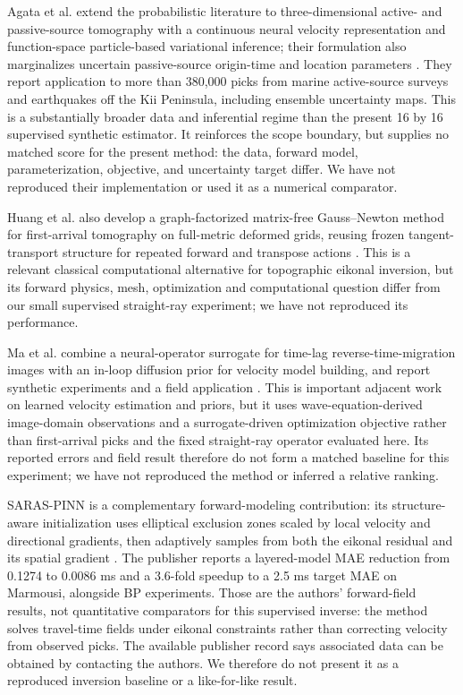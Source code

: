 \documentclass[11pt]{article}
\begin{document}
Agata et al. extend the probabilistic literature to three-dimensional active- and passive-source tomography with a continuous neural velocity representation and function-space particle-based variational inference; their formulation also marginalizes uncertain passive-source origin-time and location parameters \cite{AgataBayesian3D2026}. They report application to more than 380,000 picks from marine active-source surveys and earthquakes off the Kii Peninsula, including ensemble uncertainty maps. This is a substantially broader data and inferential regime than the present 16 by 16 supervised synthetic estimator. It reinforces the scope boundary, but supplies no matched score for the present method: the data, forward model, parameterization, objective, and uncertainty target differ. We have not reproduced their implementation or used it as a numerical comparator.

Huang et al. also develop a graph-factorized matrix-free Gauss--Newton method for first-arrival tomography on full-metric deformed grids, reusing frozen tangent-transport structure for repeated forward and transpose actions \cite{HuangDeformed2026}. This is a relevant classical computational alternative for topographic eikonal inversion, but its forward physics, mesh, optimization and computational question differ from our small supervised straight-ray experiment; we have not reproduced its performance.

Ma et al. combine a neural-operator surrogate for time-lag reverse-time-migration images with an in-loop diffusion prior for velocity model building, and report synthetic experiments and a field application \cite{MaDiffusion2026}. This is important adjacent work on learned velocity estimation and priors, but it uses wave-equation-derived image-domain observations and a surrogate-driven optimization objective rather than first-arrival picks and the fixed straight-ray operator evaluated here. Its reported errors and field result therefore do not form a matched baseline for this experiment; we have not reproduced the method or inferred a relative ranking.

SARAS-PINN is a complementary forward-modeling contribution: its structure-aware initialization uses elliptical exclusion zones scaled by local velocity and directional gradients, then adaptively samples from both the eikonal residual and its spatial gradient \cite{XiangSARAS2026}. The publisher reports a layered-model MAE reduction from 0.1274 to 0.0086 ms and a 3.6-fold speedup to a 2.5 ms target MAE on Marmousi, alongside BP experiments. Those are the authors' forward-field results, not quantitative comparators for this supervised inverse: the method solves travel-time fields under eikonal constraints rather than correcting velocity from observed picks. The available publisher record says associated data can be obtained by contacting the authors. We therefore do not present it as a reproduced inversion baseline or a like-for-like result.
\end{document}
